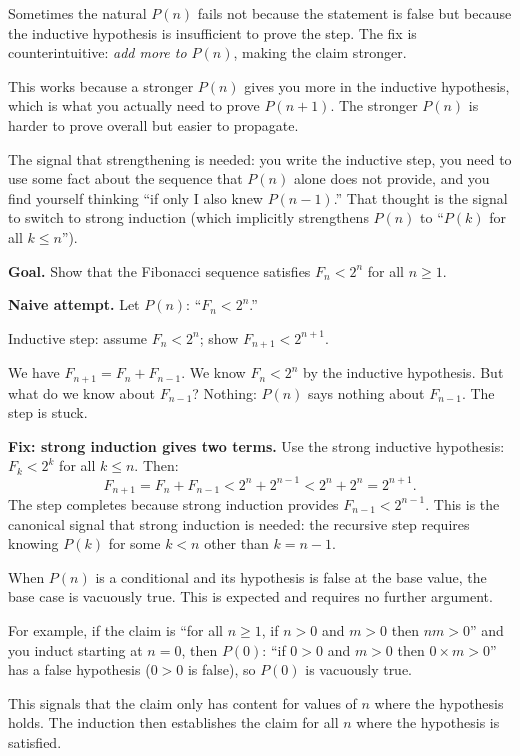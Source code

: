 \begin{remark}
Sometimes the natural $P(n)$ fails not because the statement is false
but because the inductive hypothesis is insufficient to prove the step.
The fix is counterintuitive: \emph{add more to $P(n)$}, making the claim
stronger.

This works because a stronger $P(n)$ gives you more in the inductive
hypothesis, which is what you actually need to prove $P(n+1)$.
The stronger $P(n)$ is harder to prove overall but easier to propagate.

The signal that strengthening is needed: you write the inductive step,
you need to use some fact about the sequence that $P(n)$ alone does not
provide, and you find yourself thinking ``if only I also knew $P(n-1)$.''
That thought is the signal to switch to strong induction (which implicitly
strengthens $P(n)$ to ``$P(k)$ for all $k \leq n$'').
\end{remark}

\begin{example}
\textbf{Goal.} Show that the Fibonacci sequence satisfies $F_n < 2^n$
for all $n \geq 1$.

\medskip
\noindent\textbf{Naive attempt.}
Let $P(n)$: ``$F_n < 2^n$.''

Inductive step: assume $F_n < 2^n$; show $F_{n+1} < 2^{n+1}$.

We have $F_{n+1} = F_n + F_{n-1}$. We know $F_n < 2^n$ by the
inductive hypothesis. But what do we know about $F_{n-1}$?
Nothing: $P(n)$ says nothing about $F_{n-1}$. The step is stuck.

\medskip
\noindent\textbf{Fix: strong induction gives two terms.}
Use the strong inductive hypothesis: $F_k < 2^k$ for all $k \leq n$.
Then:
\[
F_{n+1} = F_n + F_{n-1} < 2^n + 2^{n-1} < 2^n + 2^n = 2^{n+1}.
\]
The step completes because strong induction provides $F_{n-1} < 2^{n-1}$.
This is the canonical signal that strong induction is needed: the
recursive step requires knowing $P(k)$ for some $k < n$ other than
$k = n-1$.
\end{example}

\begin{remark}
When $P(n)$ is a conditional and its hypothesis is false at the base
value, the base case is vacuously true. This is expected and requires
no further argument.

For example, if the claim is ``for all $n \geq 1$, if $n > 0$ and
$m > 0$ then $nm > 0$'' and you induct starting at $n = 0$, then
$P(0)$: ``if $0 > 0$ and $m > 0$ then $0 \times m > 0$'' has a
false hypothesis ($0 > 0$ is false), so $P(0)$ is vacuously true.

This signals that the claim only has content for values of $n$ where
the hypothesis holds. The induction then establishes the claim for
all $n$ where the hypothesis is satisfied.
\end{remark}

